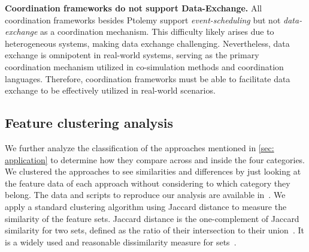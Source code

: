 \documentclass[runningheads]{llncs}
\begin{document}
\textbf{Coordination frameworks do not support Data-Exchange.}
All coordination frameworks besides Ptolemy support \textit{event-scheduling} but not \textit{data-exchange} as a coordination mechanism.
This difficulty likely arises due to heterogeneous systems, making data exchange challenging.
Nevertheless, data exchange is omnipotent in real-world systems, serving as the primary coordination mechanism utilized in co-simulation methods and coordination languages.
Therefore, coordination frameworks must be able to facilitate data exchange to be effectively utilized in real-world scenarios.

\subsection{Feature clustering analysis}

We further analyze the classification of the approaches mentioned in \autoref{sec: application} to determine how they compare across and inside the four categories.
We clustered the approaches to see similarities and differences by just looking at the feature data of each approach without considering to which category they belong.
The data and scripts to reproduce our analysis are available in~\cite{krauterCoordination2024Artifacts2024}.
We apply a standard clustering algorithm using Jaccard distance to measure the similarity of the feature sets.
Jaccard distance is the one-complement of Jaccard similarity for two sets, defined as the ratio of their intersection to their union~\cite{levandowskyDistanceSets1971}.
It is a widely used and reasonable dissimilarity measure for sets~\cite{levandowskyDistanceSets1971}.
\end{document}

